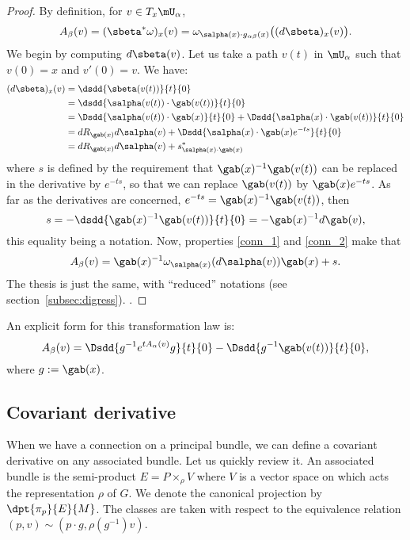 \begin{proof}
	By definition, for $v\in T_x\mU_{\alpha}$,
	\[
		A_{\beta}(v)=(\sbeta^*\omega)_x(v)=
		\omega_{\salpha(x)\cdot g_{\alpha\beta}(x)}\big((d\sbeta)_x(v)\big).
	\]
	We begin by computing $d\sbeta(v)$. Let us take a path $v(t)$ in $\mU_{\alpha}$ such that $v(0)=x$ and $v'(0)=v$. We have:
	\begin{equation}\label{eq:1407r1}
		\begin{split}
			(d\sbeta)_x(v)&=\dsdd{\sbeta(v(t))}{t}{0}\\
			&=\dsdd{\salpha(v(t))\cdot\gab(v(t))}{t}{0}\\
			&=\Dsdd{\salpha(v(t))\cdot\gab(x)}{t}{0}
			+\Dsdd{\salpha(x)\cdot\gab(v(t))}{t}{0}\\
			&=dR_{\gab(x)}d\salpha(v)+\Dsdd{\salpha(x)\cdot\gab(x)e^{-ts}}{t}{0}\\
			&=dR_{\gab(x)}d\salpha(v)+s^*_{\salpha(x)\cdot\gab(x)}
		\end{split}
	\end{equation}
	where $s$ is defined by the requirement\label{pg:justif_s} that $\gab(x)^{-1}\gab(v(t))$ can be replaced in the derivative by $e^{-ts}$, so that we can replace $\gab(v(t))$ by $\gab(x)e^{-ts}$. As far as the derivatives are concerned, $e^{-ts}=\gab(x)^{-1}\gab(v(t))$, then
	\[
		s=-\dsdd{\gab(x)^{-1}\gab(v(t))}{t}{0}=-\gab(x)^{-1} d\gab(v),
	\]
	this equality being a notation. Now, properties \eqref{conn_1} and \eqref{conn_2} make that
	\[
		A_{\beta}(v)=\gab(x)^{-1}\omega_{\salpha(x)}(d\salpha(v))\gab(x)+s.
	\]
	The thesis is just the same, with ``reduced'' notations (see section~\ref{subsec:digress}).
	.
\end{proof}
An explicit form for this transformation law is:
\begin{equation}
	A_{\beta}(v)=\Dsdd{g^{-1} e^{tA_{\alpha}(v)}g}{t}{0}-\Dsdd{g^{-1}\gab(v(t))}{t}{0},
\end{equation}
where $g:=\gab(x)$.

\subsection{Covariant derivative}

When we have a connection on a principal bundle, we can define a covariant derivative on any associated bundle. Let us quickly review it. An associated bundle is the semi-product $E=P\times_{\rho} V$ where $V$ is a vector space on which acts the representation $\rho$ of $G$. We denote the canonical projection by $\dpt{\pi_p}{E}{M}$. The classes are taken with respect to the equivalence relation $(p,v)\sim(p\cdot g,\rho(g^{-1})v)$.

